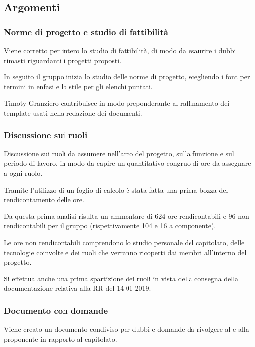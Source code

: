         \subsection{Argomenti}
            \subsubsection{Norme di progetto e studio di fattibilità}
            Viene corretto per intero lo studio di fattibilità, di modo da esaurire i dubbi rimasti riguardanti i progetti proposti.\par
            In seguito il gruppo inizia lo studio delle norme di progetto, scegliendo i font per termini in enfasi e lo stile per gli elenchi puntati.\par
            Timoty Granziero contribuisce in modo preponderante al raffinamento dei template usati nella redazione dei documenti.

            \subsubsection{Discussione sui ruoli}
            Discussione sui ruoli da assumere nell'arco del progetto, sulla funzione e sul periodo di lavoro, in modo da capire un quantitativo congruo di ore da assegnare a ogni ruolo.\par
            Tramite l'utilizzo di un foglio di calcolo è stata fatta una prima bozza del rendicontamento delle ore.\par
Da questa prima analisi risulta un ammontare di 624 ore rendicontabili e 96 non rendicontabili per il gruppo (rispettivamente 104 e 16 a componente).\par
Le ore non rendicontabili comprendono lo studio personale del capitolato, delle tecnologie coinvolte e dei ruoli che verranno ricoperti dai membri all'interno del progetto.\par
Si effettua anche una prima spartizione dei ruoli in vista della consegna della documentazione relativa alla RR del 14-01-2019.\par

            \subsubsection{Documento con domande}
            Viene creato un documento condiviso per dubbi e domande da rivolgere al {\TV} e alla proponente {\II} in rapporto al capitolato.\par


